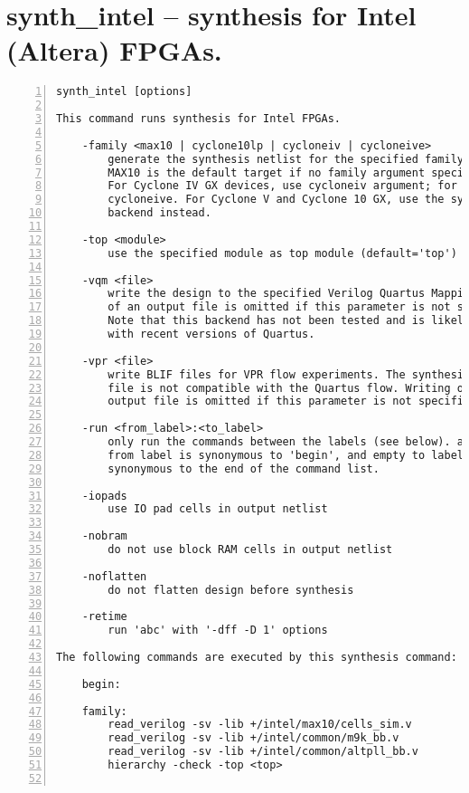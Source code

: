 \section{synth\_intel -- synthesis for Intel (Altera) FPGAs.}
\label{cmd:synth_intel}
\begin{lstlisting}[numbers=left,frame=single]
    synth_intel [options]

This command runs synthesis for Intel FPGAs.

    -family <max10 | cyclone10lp | cycloneiv | cycloneive>
        generate the synthesis netlist for the specified family.
        MAX10 is the default target if no family argument specified.
        For Cyclone IV GX devices, use cycloneiv argument; for Cyclone IV E, use
        cycloneive. For Cyclone V and Cyclone 10 GX, use the synth_intel_alm
        backend instead.

    -top <module>
        use the specified module as top module (default='top')

    -vqm <file>
        write the design to the specified Verilog Quartus Mapping File. Writing
        of an output file is omitted if this parameter is not specified.
        Note that this backend has not been tested and is likely incompatible
        with recent versions of Quartus.

    -vpr <file>
        write BLIF files for VPR flow experiments. The synthesized BLIF output
        file is not compatible with the Quartus flow. Writing of an
        output file is omitted if this parameter is not specified.

    -run <from_label>:<to_label>
        only run the commands between the labels (see below). an empty
        from label is synonymous to 'begin', and empty to label is
        synonymous to the end of the command list.

    -iopads
        use IO pad cells in output netlist

    -nobram
        do not use block RAM cells in output netlist

    -noflatten
        do not flatten design before synthesis

    -retime
        run 'abc' with '-dff -D 1' options

The following commands are executed by this synthesis command:

    begin:

    family:
        read_verilog -sv -lib +/intel/max10/cells_sim.v
        read_verilog -sv -lib +/intel/common/m9k_bb.v
        read_verilog -sv -lib +/intel/common/altpll_bb.v
        hierarchy -check -top <top>


\end{lstlisting}
